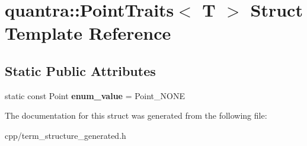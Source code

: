 \hypertarget{structquantra_1_1PointTraits}{}\section{quantra\+:\+:Point\+Traits$<$ T $>$ Struct Template Reference}
\label{structquantra_1_1PointTraits}
\subsection*{Static Public Attributes}
\begin{DoxyCompactItemize}
\item 
\mbox{\label{structquantra_1_1PointTraits_acf5e62864925372ac8d573d9dc5a64a4}} 
static const Point {\bfseries enum\+\_\+value} = Point\+\_\+\+N\+O\+NE
\end{DoxyCompactItemize}


The documentation for this struct was generated from the following file\+:\begin{DoxyCompactItemize}
\item 
cpp/term\+\_\+structure\+\_\+generated.\+h\end{DoxyCompactItemize}

